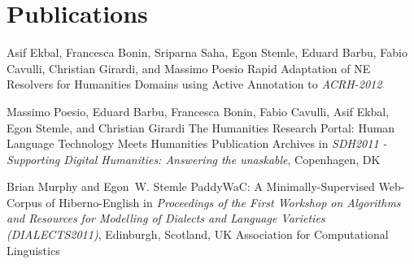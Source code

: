 \documentclass[11pt,a4paper]{moderncv}
\begin{document}

%
%


%
%

\section{Publications}
    {Asif Ekbal, Francesca Bonin, Sriparna Saha, Egon Stemle, Eduard Barbu,
    Fabio Cavulli, Christian Girardi, and Massimo Poesio}
    {\small Rapid Adaptation of NE Resolvers for Humanities Domains using Active
  Annotation}
    {\small to {\em ACRH-2012}}
    {}
    {}

    {Massimo Poesio, Eduard Barbu, Francesca Bonin, Fabio Cavulli, Asif Ekbal,
    Egon Stemle, and Christian Girardi}
    {\small The Humanities Research Portal: Human Language Technology Meets
    Humanities Publication Archives}
    {\small in {\em SDH2011 - Supporting Digital Humanities: Answering the 
    unaskable}, Copenhagen, DK}
    {}
    {}

    {Brian Murphy and Egon~W. Stemle}
    {\small PaddyWaC: A Minimally-Supervised Web-Corpus of Hiberno-English}
    {\small in {\em Proceedings of the First Workshop on Algorithms and Resources
    for Modelling of Dialects and Language Varieties (DIALECTS2011)}, Edinburgh, Scotland, UK}
    {\small Association for Computational Linguistics}
    {}
\end{document}
